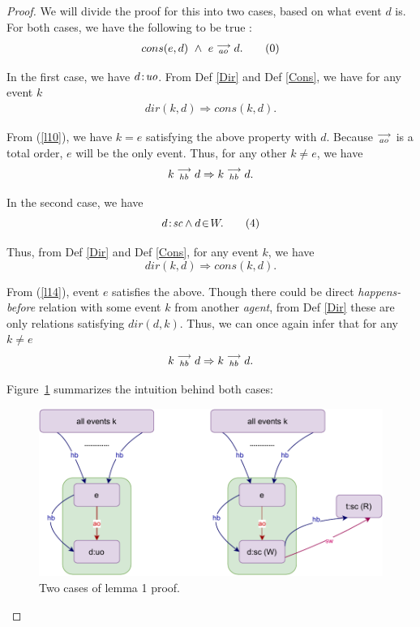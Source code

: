 \begin{proof}
    
    We will divide the proof for this into two cases, based on what event $d$ is. For both cases, we have the following to be true :
    \begin{align*}
        cons(e,d) \ \wedge \ e\stackrel{\longrightarrow}{_{ao}}d.
        \tag{0}
        \label{l10}
    \end{align*}
        
    In the first case, we have $d\!:\!\textit{uo}$. From Def \ref{Dir} and Def \ref{Cons}, we have for any event $k$
    \begin{align*}
        dir(k,d) \Rightarrow cons(k,d).
    \end{align*}
        
    From (\ref{l10}), we have $k=e$ satisfying the above property with $d$. 
    Because $\stackrel{\longrightarrow}{_{ao}}$ is a total order, $e$ will be the only event. Thus, for any other $k \neq e$, we have     
    \begin{align*}
        k\stackrel{\longrightarrow}{_{hb}}d \Rightarrow k\stackrel{\longrightarrow}{_{hb}}d.
    \end{align*}
    
    In the second case, we have 
    \[
        d\!:\!\textit{sc} \wedge d\!\in\!W.
        \tag{4}
        \label{l14}
    \]
    
    Thus, from Def \ref{Dir} and Def \ref{Cons}, for any event $k$, we have 
    \[
        dir(k,d) \Rightarrow cons(k,d).
    \]
    
    From (\ref{l14}), event $e$ satisfies the above.
    Though there could be direct \textit{happens-before} relation with some event $k$ from another \textit{agent}, from Def \ref{Dir} these are only relations satisfying $dir(d,k)$. Thus, we can once again infer that for any $k \neq e$ 
    \[
        k\stackrel{\longrightarrow}{_{hb}}d \Rightarrow k\stackrel{\longrightarrow}{_{hb}}d.
    \]
    
    Figure~\ref{lemma:first} summarizes the intuition behind both cases: 
    \begin{figure}[H]
        \centering
        \includegraphics[scale=0.7]{4.InstructionReordering/3.Lemmas/Lemma1.pdf}
        \caption{Two cases of lemma 1 proof.}
        \label{lemma:first}
    \end{figure}
    
\end{proof}

